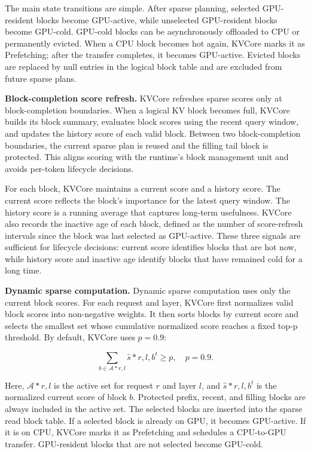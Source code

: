 \documentclass[sigplan,10pt,review,anonymous]{acmart}
\begin{document}
The main state transitions are simple.
After sparse planning, selected GPU-resident blocks become GPU-active, while unselected GPU-resident blocks become GPU-cold.
GPU-cold blocks can be asynchronously offloaded to CPU or permanently evicted.
When a CPU block becomes hot again, KVCore marks it as Prefetching; after the transfer completes, it becomes GPU-active.
Evicted blocks are replaced by null entries in the logical block table and are excluded from future sparse plans.

\noindent\textbf{Block-completion score refresh.}
KVCore refreshes sparse scores only at block-completion boundaries.
When a logical KV block becomes full, KVCore builds its block summary, evaluates block scores using the recent query window, and updates the history score of each valid block.
Between two block-completion boundaries, the current sparse plan is reused and the filling tail block is protected.
This aligns scoring with the runtime's block management unit and avoids per-token lifecycle decisions.

For each block, KVCore maintains a current score and a history score.
The current score reflects the block's importance for the latest query window.
The history score is a running average that captures long-term usefulness.
KVCore also records the inactive age of each block, defined as the number of score-refresh intervals since the block was last selected as GPU-active.
These three signals are sufficient for lifecycle decisions:
current score identifies blocks that are hot now, while history score and inactive age identify blocks that have remained cold for a long time.

\noindent\textbf{Dynamic sparse computation.}
Dynamic sparse computation uses only the current block scores.
For each request and layer, KVCore first normalizes valid block scores into non-negative weights.
It then sorts blocks by current score and selects the smallest set whose cumulative normalized score reaches a fixed top-p threshold.
By default, KVCore uses $p=0.9$:

$$
\sum_{b \in \mathcal{A}*{r,l}} \hat{s}*{r,l,b}^{t} \ge p,
\quad p=0.9 .
$$

Here, $\mathcal{A}*{r,l}$ is the active set for request $r$ and layer $l$, and $\hat{s}*{r,l,b}^{t}$ is the normalized current score of block $b$.
Protected prefix, recent, and filling blocks are always included in the active set.
The selected blocks are inserted into the sparse read block table.
If a selected block is already on GPU, it becomes GPU-active.
If it is on CPU, KVCore marks it as Prefetching and schedules a CPU-to-GPU transfer.
GPU-resident blocks that are not selected become GPU-cold.
\end{document}
